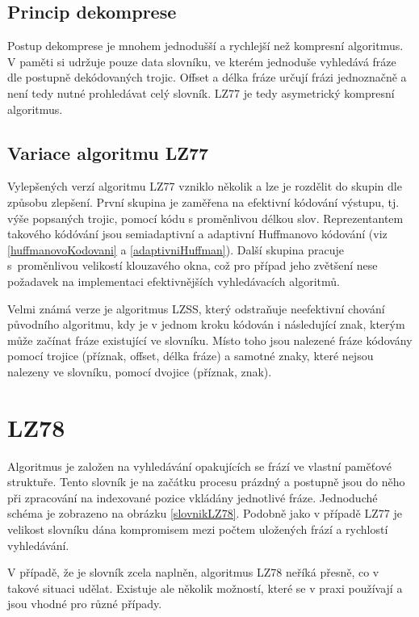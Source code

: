 \subsection{Princip dekomprese}
Postup dekomprese je mnohem jednodušší a rychlejší než kompresní algoritmus. V paměti si udržuje pouze data slovníku, ve kterém jednoduše vyhledává fráze dle postupně de\-kó\-do\-va\-ných trojic. Offset a délka fráze určují frázi jednoznačně a není tedy nutné prohledávat celý slovník. LZ77 je tedy asymetrický kompresní algoritmus.

\subsection{Variace algoritmu LZ77}
Vylepšených verzí algoritmu LZ77 vzniklo několik a lze je rozdělit do skupin dle způsobu zlepšení. První skupina je zaměřena na efektivní kódování výstupu, tj. výše popsaných trojic, pomocí kódu s proměnlivou délkou slov. Reprezentantem takového kódóvání jsou semiadaptivní a adaptivní Huffmanovo kódování (viz \ref{huffmanovoKodovani} a \ref{adaptivniHuffman}). Další skupina pracuje s~proměnlivou velikostí klouzavého okna, což pro případ jeho zvětšení nese požadavek na implementaci efektivnějších vyhledávacích algoritmů.

Velmi známá verze je algoritmus LZSS, který odstraňuje neefektivní chování původního algoritmu, kdy je v jednom kroku kódován i následující znak, kterým může začínat fráze existující ve slovníku. Místo toho jsou nalezené fráze kódovány pomocí trojice (příznak, offset, délka fráze) a samotné znaky, které nejsou nalezeny ve slovníku, pomocí dvojice (příznak, znak).

\section{LZ78}
Algoritmus je založen na vyhledávání opakujících se frází ve vlastní paměťové struktuře. Tento slovník je na začátku procesu prázdný a postupně jsou do něho při zpracování na indexované pozice vkládány jednotlivé fráze. Jednoduché schéma je zobrazeno na obrázku \ref{slovnikLZ78}. Podobně jako v případě LZ77 je velikost slovníku dána kompromisem mezi počtem uložených frází a rychlostí vyhledávání.

V případě, že je slovník zcela naplněn, algoritmus LZ78 neříká přesně, co v takové situaci udělat. Existuje ale několik možností, které se v praxi používají a jsou vhodné pro různé případy.

